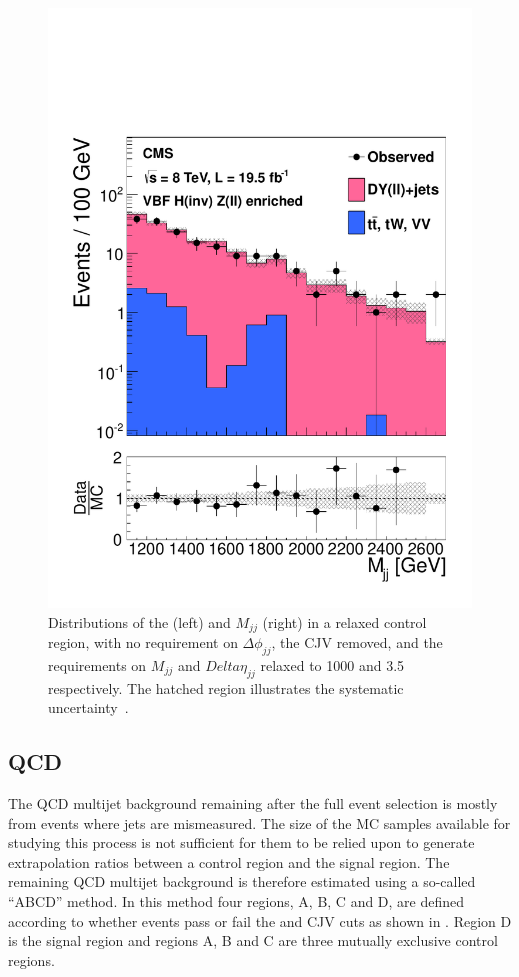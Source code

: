 \begin{figure}
  \includegraphics[width=.6\largefigwidth]{plots/prompt/VBF-ZCtrl-Mjj.pdf}
  \caption{Distributions of the \MET (left) and $M_{jj}$ (right) in a relaxed \PZ control region, with no requirement on $\Delta\phi_{jj}$, the \ac{CJV} removed, and the requirements on $M_{jj}$ and $Delta\eta_{jj}$ relaxed to 1000 \GeV and 3.5 respectively. The hatched region illustrates the systematic uncertainty~\cite{Chatrchyan:2014tja}.}
  \label{fig:promptznunu}
\end{figure}




\subsection{QCD}
\label{sec:promptacQCD}
The \ac{QCD} multijet background remaining after the full event selection is mostly from events where jets are mismeasured. The size of the \ac{MC} samples available for studying this process is not sufficient for them to be relied upon to generate extrapolation ratios between a control region and the signal region. The remaining \ac{QCD} multijet background is therefore estimated using a so-called ``ABCD'' method. In this method four regions, A, B, C and D, are defined according to whether events pass or fail the \MET and \ac{CJV} cuts as shown in . Region D is the signal region and regions A, B and C are three mutually exclusive control regions.

